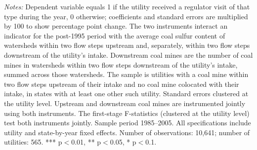 \begin{table}[htbp]
\begin{minipage}{\linewidth}
\textit{Notes:} Dependent variable equals 1 if the utility received a regulator visit of that type during the year, 0 otherwise; coefficients and standard errors are multiplied by 100 to show percentage point change. The two instruments interact an indicator for the post-1995 period with the average coal sulfur content of watersheds within two flow steps upstream and, separately, within two flow steps downstream of the utility's intake. Downstream coal mines are the number of coal mines in watersheds within two flow steps downstream of the utility's intake, summed across those watersheds. The sample is utilities with a coal mine within two flow steps upstream of their intake and no coal mine colocated with their intake, in states with at least one other such utility. Standard errors clustered at the utility level. Upstream and downstream coal mines are instrumented jointly using both instruments. The first-stage F-statistics (clustered at the utility level) test both instruments jointly. Sample period 1985--2005. All specifications include utility and state-by-year fixed effects. Number of observations: 10,641; number of utilities: 565. *** p$<$0.01, ** p$<$0.05, * p$<$0.1.
\end{minipage}
\end{table}
